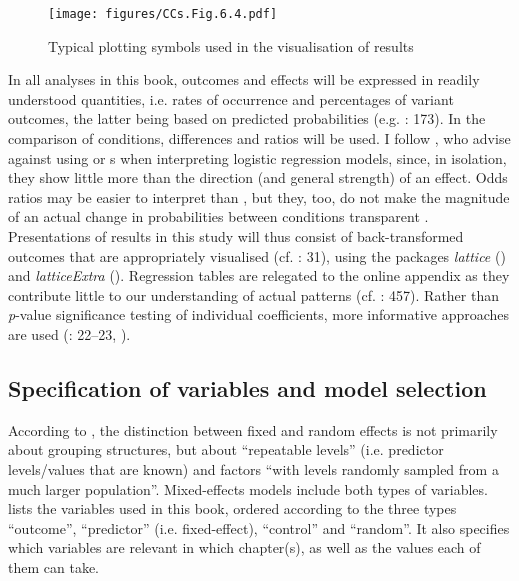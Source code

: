 \begin{figure}
\texttt{[image: figures/CCs.Fig.6.4.pdf]}
\caption{\label{bkm:Ref74567287}\label{fig:6.4}Typical plotting symbols used in the visualisation of results}
\end{figure}

In all analyses in this book, outcomes and effects will be expressed in readily understood quantities, i.e. rates of occurrence and percentages of variant outcomes, the latter being based on predicted probabilities (e.g. \citealt{Long2015}: 173). In the comparison of conditions, differences and ratios will be used. I follow \citet{BestWolf2015}, who advise against using  or s when interpreting logistic regression models, since, in isolation, they show little more than the direction (and general strength) of an effect. Odds ratios may be easier to interpret than , but they, too, do not make the magnitude of an actual change in probabilities between conditions transparent \citep[188]{Long2015}. Presentations of results in this study will thus consist of back-transformed outcomes that are appropriately visualised (cf. \citealt{BolstadCurran2017}: 31), using the  packages \textit{lattice} (\citealt{Sarkar2008,Sarkar2021}) and \textit{latticeExtra} (\citealt{SarkarAndrews2019}). Regression tables are relegated to the online appendix as they contribute little to our understanding of actual patterns (cf. \citealt{GelmanHill2007}: 457). Rather than \textit{p}{}-value significance testing of individual coefficients, more informative  approaches are used (\citealt{GelmanHill2007}: 22–23, \citealt{CummingCalin-Jageman2017}).

\subsection{\label{bkm:Ref35244287}\label{bkm:Ref41305990}\label{bkm:Ref41473424}Specification of variables and model selection}\label{sec:6.3.6}

According to \citet[241–242]{Baayen2008}, the distinction between fixed and random effects is not primarily about grouping structures, but about “repeatable levels” (i.e. predictor levels/values that are known) and factors “with levels randomly sampled from a much larger population”. Mixed-effects models include both types of variables.  lists the variables used in this book, ordered according to the three types “outcome”, “predictor” (i.e. fixed-effect), “control” and “random”. It also specifies which variables are relevant in which chapter(s), as well as the values each of them can take.

